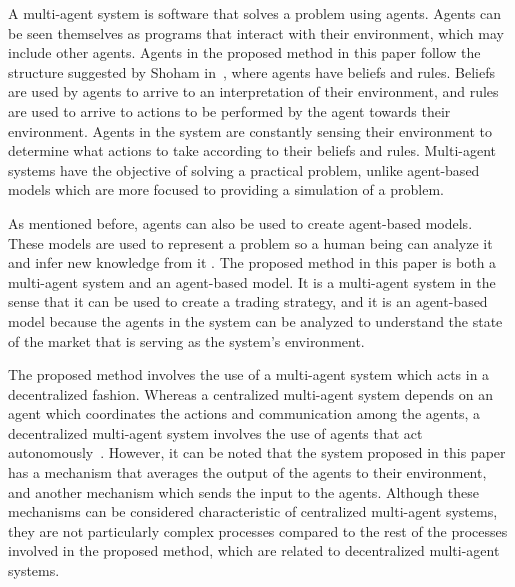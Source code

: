 \documentclass{ieeeaccess}
\begin{document}
A multi-agent system is software that solves a problem using agents. Agents can
be seen themselves as programs that interact with their environment, which may
include other agents. Agents in the proposed method in this paper follow the
structure suggested by Shoham in~\cite{Shoham1993}, where agents have
beliefs and rules. Beliefs are used by agents to arrive to an interpretation of
their environment, and rules are used to arrive to actions to be performed by
the agent towards their environment. Agents in the system are constantly
sensing their environment to determine what actions to take according to their
beliefs and rules. Multi-agent systems have the objective of solving a practical
problem, unlike agent-based models which are more focused to providing a
simulation of a problem.

As mentioned before, agents can also be used to create agent-based models. These
models are used to represent a problem so a human being can analyze it and infer
new knowledge from it \cite{Grothmann2002}.
The proposed method in this paper is both a multi-agent system and an
agent-based model. It is a multi-agent system in the sense that it can be used
to create a trading strategy, and it is an agent-based model because the agents
in the system can be analyzed to understand the state of the market that is
serving as the system's environment.



The proposed method involves the use of a multi-agent system which acts in a
decentralized fashion. Whereas a centralized multi-agent system depends on an
agent which coordinates the actions and communication among the agents, a
decentralized multi-agent system involves the use of agents that act
autonomously~\cite{andreadis2014classification}. However, it can be noted that
the system proposed in this paper has a mechanism that averages the output of
the agents to their environment, and another mechanism which sends the input to
the agents. Although these mechanisms can be considered characteristic of
centralized multi-agent systems, they are not particularly complex processes
compared to the rest of the processes involved in the proposed method, which are
related to decentralized multi-agent systems.
\end{document}
